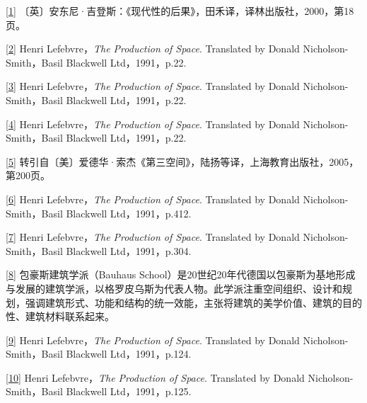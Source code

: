 \documentclass[UTF8, fontset = sourcesans, a4paper, oneside, zihao =
-4, scheme=chinese, no-math, space=true]{ctexbook}
\begin{document}
\protect\hypertarget{part0006_split_003.htmlux5cux23m1}{}{}\protect\hyperlink{part0006_split_000.htmlux5cux23w1}{{[}1{]}}
〔英〕安东尼·吉登斯：《现代性的后果》，田禾译，译林出版社，2000，第18页。

\protect\hypertarget{part0006_split_003.htmlux5cux23m2}{}{}\protect\hyperlink{part0006_split_001.htmlux5cux23w2}{{[}2{]}}
Henri Lefebvre，\emph{The Production of Space}. Translated by Donald
Nicholson-Smith，Basil Blackwell Ltd，1991，p.22.

\protect\hypertarget{part0006_split_003.htmlux5cux23m3}{}{}\protect\hyperlink{part0006_split_001.htmlux5cux23w3}{{[}3{]}}
Henri Lefebvre，\emph{The Production of Space}. Translated by Donald
Nicholson-Smith，Basil Blackwell Ltd，1991，p.22.

\protect\hypertarget{part0006_split_003.htmlux5cux23m4}{}{}\protect\hyperlink{part0006_split_001.htmlux5cux23w4}{{[}4{]}}
Henri Lefebvre，\emph{The Production of Space}. Translated by Donald
Nicholson-Smith，Basil Blackwell Ltd，1991，p.22.

\protect\hypertarget{part0006_split_003.htmlux5cux23m5}{}{}\protect\hyperlink{part0006_split_001.htmlux5cux23w5}{{[}5{]}}
转引自〔美〕爱德华·索杰《第三空间》，陆扬等译，上海教育出版社，2005，第200页。

\protect\hypertarget{part0006_split_003.htmlux5cux23m6}{}{}\protect\hyperlink{part0006_split_001.htmlux5cux23w6}{{[}6{]}}
Henri Lefebvre，\emph{The Production of Space}. Translated by Donald
Nicholson-Smith，Basil Blackwell Ltd，1991，p.412.

\protect\hypertarget{part0006_split_003.htmlux5cux23m7}{}{}\protect\hyperlink{part0006_split_001.htmlux5cux23w7}{{[}7{]}}
Henri Lefebvre，\emph{The Production of Space}. Translated by Donald
Nicholson-Smith，Basil Blackwell Ltd，1991，p.304.

\protect\hypertarget{part0006_split_003.htmlux5cux23m8}{}{}\protect\hyperlink{part0006_split_001.htmlux5cux23w8}{{[}8{]}}
包豪斯建筑学派（Bauhaus
School）是20世纪20年代德国以包豪斯为基地形成与发展的建筑学派，以格罗皮乌斯为代表人物。此学派注重空间组织、设计和规划，强调建筑形式、功能和结构的统一效能，主张将建筑的美学价值、建筑的目的性、建筑材料联系起来。

\protect\hypertarget{part0006_split_003.htmlux5cux23m9}{}{}\protect\hyperlink{part0006_split_001.htmlux5cux23w9}{{[}9{]}}
Henri Lefebvre，\emph{The Production of Space}. Translated by Donald
Nicholson-Smith，Basil Blackwell Ltd，1991，p.124.

\protect\hypertarget{part0006_split_003.htmlux5cux23m10}{}{}\protect\hyperlink{part0006_split_001.htmlux5cux23w10}{{[}10{]}}
Henri Lefebvre，\emph{The Production of Space}. Translated by Donald
Nicholson-Smith，Basil Blackwell Ltd，1991，p.125.
\end{document}
